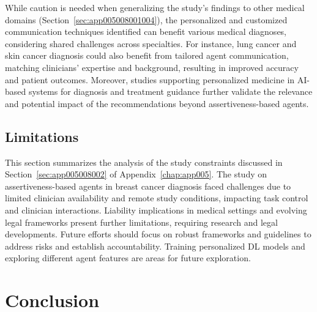 While caution is needed when generalizing the study's findings to other medical domains (Section~\ref{sec:app005008001004}), the personalized and customized communication techniques identified can benefit various medical diagnoses, considering shared challenges across specialties.
For instance, lung cancer and skin cancer diagnosis could also benefit from tailored agent communication, matching clinicians' expertise and background, resulting in improved accuracy and patient outcomes.
Moreover, studies supporting personalized medicine in \ac{AI}-based systems for diagnosis and treatment guidance further validate the relevance and potential impact of the recommendations beyond assertiveness-based agents.

\subsection{Limitations}
\label{sec:chap006007002}

This section summarizes the analysis of the study constraints discussed in Section~\ref{sec:app005008002} of Appendix~\ref{chap:app005}.
The study on assertiveness-based agents in breast cancer diagnosis faced challenges due to limited clinician availability and remote study conditions, impacting task control and clinician interactions.
Liability implications in medical settings and evolving legal frameworks present further limitations, requiring research and legal developments.
Future efforts should focus on robust frameworks and guidelines to address risks and establish accountability.
Training personalized \ac{DL} models and exploring different agent features are areas for future exploration.

\section{Conclusion}
\label{sec:chap006008}


